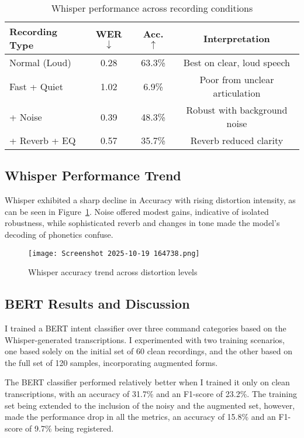 \documentclass[11pt,a4paper]{article}
\begin{document}
\begin{table}[h]
\centering
\caption{Whisper performance across recording conditions}
\label{tab:whisper_results}
\footnotesize
\begin{tabular}{lccc}
\toprule
\textbf{Recording Type} & \textbf{WER $\downarrow$} & \textbf{Acc. $\uparrow$} & \textbf{Interpretation} \\
\midrule
Normal (Loud) & 0.28 & 63.3\% & Best on clear, loud speech \\
Fast + Quiet & 1.02 & 6.9\% & Poor from unclear articulation \\
+ Noise & 0.39 & 48.3\% & Robust with background noise \\
+ Reverb + EQ & 0.57 & 35.7\% & Reverb reduced clarity \\
\bottomrule
\end{tabular}
\end{table}
\subsection{Whisper Performance Trend}
Whisper exhibited a sharp decline in Accuracy with rising distortion intensity, as can be seen in Figure~\ref{fig:accuracy_trend}. Noise offered modest gains, indicative of isolated robustness, while sophisticated reverb and changes in tone made the model's decoding of phonetics confuse.


\begin{figure}[h]
\centering
\texttt{[image: Screenshot 2025-10-19 164738.png]}
\caption{Whisper accuracy trend across distortion levels}
\label{fig:accuracy_trend}  %
\end{figure}
\subsection{BERT Results and Discussion}
I trained a BERT intent classifier over three command categories based on the Whisper-generated transcriptions. I experimented with two training scenarios, one based solely on the initial set of 60 clean recordings, and the other based on the full set of 120 samples, incorporating augmented forms.

The BERT classifier performed relatively better when I trained it only on clean transcriptions, with an accuracy of 31.7\% and an F1-score of 23.2\%. The training set being extended to the inclusion of the noisy and the augmented set, however, made the performance drop in all the metrics, an accuracy of 15.8\% and an F1-score of 9.7\% being registered.
\end{document}
